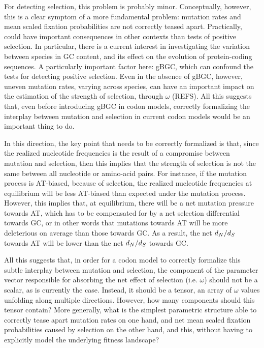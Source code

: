For detecting selection, this problem is probably minor.
Conceptually, however, this is a clear symptom of a more fundamental problem: mutation rates and mean scaled fixation probabilities are not correctly teased apart.
Practically, could have important consequences in other contexts than tests of positive selection.
In particular, there is a current interest in investigating the variation between species in GC content, and its effect on the evolution of protein-coding sequences.
A particularly important factor here: gBGC, which can confound the tests for detecting positive selection.
Even in the absence of gBGC, however, uneven mutation rates, varying across species, can have an important impact on the estimation of the strength of selection, through $\omega$ (REFS).
All this suggests that, even before introducing gBGC in codon models, correctly formalizing the interplay between mutation and selection in current codon models would be an important thing to do.

In this direction, the key point that needs to be correctly formalized is that, since the realized nucleotide frequencies is the result of a compromise between mutation and selection, then this implies that the strength of selection is not the same between all nucleotide or amino-acid pairs.
For instance, if the mutation process is AT-biased, because of selection, the realized nucleotide frequencies at equilibrium will be less AT-biased than expected under the mutation process.
However, this implies that, at equilibrium, there will be a net mutation pressure towards AT, which has to be compensated for by a net selection differential towards GC, or in other words that mutations towards AT will be more deleterious on average than those towards GC.
As a result, the net $d_N / d_S$ towards AT will be lower than the net $d_N / d_S$ towards GC.

All this suggests that, in order for a codon model to correctly formalize this subtle interplay between mutation and selection, the component of the parameter vector responsible for absorbing the net effect of selection (i.e. $\omega$) should not be a scalar, as is currently the case.
Instead, it should be a tensor, an array of $\omega$ values unfolding along multiple directions.
However, how many components should this tensor contain?
More generally, what is the simplest parametric structure able to correctly tease apart mutation rates on one hand, and net mean scaled fixation probabilities caused by selection on the other hand, and this, without having to explicitly model the underlying fitness landscape?

